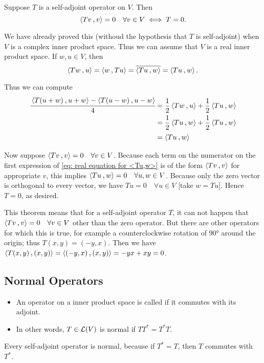 \begin{thm}
   \label{thm: T self-adjoint and <Tv,v>=0 for all v <=> T=0}
   Suppose $T$ is a self-adjoint operator on $V$. Then
   \[
     \ip{Tv}{v} = 0 \quad \forall v \in V \iff T = 0.
   \]
\end{thm}
\begin{prf}
  We have already proved this (withoud the hypothesis that $T$ is self-adjoint) when $V$ is a complex inner product space. Thus we can assume that $V$ is a real inner product space. If $w,u \in V$, then
  \[
  \ip{Tw}{u} = \ip{w}{Tu} = \overline{\ip{Tu}{w}} = \ip{Tu}{w}.
  \]

  Thus we can compute
  \begin{equation}
      \label{eq: real equation for <Tu,w>}
    \begin{aligned}
    \cfrac{\ip{T(u+w)}{u+w} - \ip{T(u-w)}{u-w}}{4}
    &= \frac{1}{2} \ip{Tw}{u} + \frac{1}{2} \ip{Tu}{w} \\
    &= \frac{1}{2} \ip{Tu}{w} + \frac{1}{2} \ip{Tu}{w} \\
    &= \ip{Tu}{w}
    \end{aligned}
  \end{equation}


  Now suppose $\ip{Tv}{v} = 0 \quad \forall v \in V$. Because each term on the numerator on the first expression of \eqref{eq: real equation for <Tu,w>} is of the form $\ip{Tv}{v}$ for appropriate $v$, this implies $\ip{Tu}{w} = 0 \quad \forall u,w \in V$. Because only the zero vector is orthogonal to every vector, we have $Tu=0 \quad \forall u \in V$ [take $w=Tu$]. Hence $T=0$, as desired.
\end{prf}

This theorem means that for a self-adjoint operator $T$, it can not happen that $\ip{Tv}{v} = 0 \quad \forall v \in V$ other than the zero operator. But there are other operators for which this is true, for example a counterclockwise rotation of 90° around the origin; thus $T(x,y) = (-y,x)$. Then we have $\ip{T(x,y)}{(x,y)} = \ip{(-y,x)}{(x,y)}=-yx+xy=0$.

\subsection{Normal Operators}

\begin{mydef}[normal]
  \begin{itemize}
  \item An operator on a inner product space is called  if it commutes with its adjoint.

  \item In other words, $T \in \mathcal{L} (V)$ is normal if $TT^* = T^* T.$

  \end{itemize}
Every self-adjoint operator is normal, because if $T^* = T$, then $T$ commutes with $T^*$.
\end{mydef}

